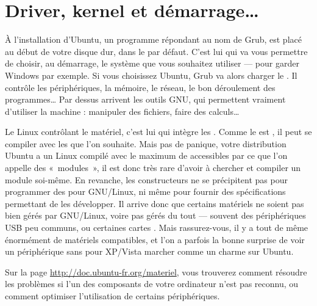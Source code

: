 \section{Driver, kernel et démarrage\ldots{}}
À l'installation d'Ubuntu, un programme répondant au nom de Grub, est placé au début de votre disque dur, dans le  par défaut. C'est lui qui va vous permettre de choisir, au démarrage, le système que vous souhaitez utiliser --- pour garder Windows par exemple. Si vous choisissez Ubuntu, Grub va alors charger le . Il contrôle les périphériques, la mémoire, le réseau, le bon déroulement des programmes\ldots{} Par dessus arrivent les outils GNU, qui permettent vraiment d'utiliser la machine : manipuler des fichiers, faire des calculs\ldots{} \par
Le  Linux contrôlant le matériel, c'est lui qui intègre les . Comme le  est , il peut se compiler avec les  que l'on souhaite. Mais pas de panique, votre distribution Ubuntu a un  Linux compilé avec le maximum de  accessibles par ce que l'on appelle des «~modules~», il est donc très rare d'avoir à chercher et compiler un module soi-même. En revanche, les constructeurs ne se précipitent pas pour programmer des  pour GNU/Linux, ni même pour fournir des spécifications permettant de les développer. Il arrive donc que certains matériels ne soient pas bien gérés par GNU/Linux, voire pas gérés du tout --- souvent des périphériques USB peu communs, ou certaines cartes . Mais rassurez-vous, il y a tout de même énormément de matériels compatibles, et l'on a parfois la bonne surprise de voir un périphérique sans  pour XP/Vista marcher comme un charme sur Ubuntu.
\begin{nota}
Sur la page \url{http://doc.ubuntu-fr.org/materiel}, vous trouverez comment résoudre les problèmes si l'un des composants de votre ordinateur n'est pas reconnu, ou comment optimiser l'utilisation de certains périphériques.
\end{nota}
